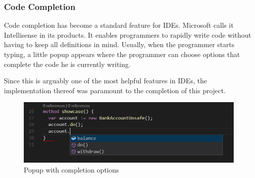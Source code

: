  \subsubsection{Code Completion} \label{codecompletion}
 Code completion has become a standard feature for IDEs. Microsoft calls it Intellisense in its products. It enables programmers to rapidly write code without having to keep all definitions in mind. Usually, when the programmer starts typing, a little popup appears where the programmer can choose options that complete the code he is currently writing. \newline
 
 Since this is arguably one of the most helpful features in IDEs, the implementation thereof was paramount to the completion of this project. \newline
 
 \begin{figure}[H]
 	\centering
 	\includegraphics[width=1\textwidth]{img/codeCompletionOverview}
 	\caption{Popup with completion options}
 	\label{fig:codecompletionoverview}
 \end{figure}
 
